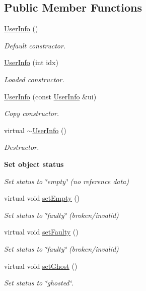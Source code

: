 \subsection*{Public Member Functions}
\begin{DoxyCompactItemize}
\item 
\hyperlink{classAnalysis_1_1FastJet_1_1UserInfo_a200d4c59fd157da608f7536449dd225b}{User\+Info} ()
\begin{DoxyCompactList}\small\item\em Default constructor. \end{DoxyCompactList}\item 
\hyperlink{classAnalysis_1_1FastJet_1_1UserInfo_af1e1e8981d308187f1722dcf6ae60039}{User\+Info} (int idx)
\begin{DoxyCompactList}\small\item\em Loaded constructor. \end{DoxyCompactList}\item 
\hyperlink{classAnalysis_1_1FastJet_1_1UserInfo_a09681790d8cfd040ee05967ceafc80f3}{User\+Info} (const \hyperlink{classAnalysis_1_1FastJet_1_1UserInfo}{User\+Info} \&ui)
\begin{DoxyCompactList}\small\item\em Copy constructor. \end{DoxyCompactList}\item 
virtual \hyperlink{classAnalysis_1_1FastJet_1_1UserInfo_aaa606bdfd9a79327258d5296fe4108a8}{$\sim$\+User\+Info} ()
\begin{DoxyCompactList}\small\item\em Destructor. \end{DoxyCompactList}\end{DoxyCompactItemize}
\begin{Indent}{\bf Set object status}\par
{\em Set status to \char`\"{}empty\char`\"{} (no reference data) }\begin{DoxyCompactItemize}
\item 
virtual void \hyperlink{classAnalysis_1_1FastJet_1_1UserInfo_ab87ca9e42c15c24c8f54bad4b9674d0c}{set\+Empty} ()
\begin{DoxyCompactList}\small\item\em Set status to \char`\"{}faulty\char`\"{} (broken/invalid) \end{DoxyCompactList}\item 
virtual void \hyperlink{classAnalysis_1_1FastJet_1_1UserInfo_a0c5efdcfb658e75538dd5ec29c27afe0}{set\+Faulty} ()
\begin{DoxyCompactList}\small\item\em Set status to \char`\"{}faulty\char`\"{} (broken/invalid) \end{DoxyCompactList}\item 
virtual void \hyperlink{classAnalysis_1_1FastJet_1_1UserInfo_ab22ff88713e1ad12bd2311cc4f1c998c}{set\+Ghost} ()
\begin{DoxyCompactList}\small\item\em Set status to \char`\"{}ghosted\char`\"{}. \end{DoxyCompactList}\end{DoxyCompactItemize}
\end{Indent}
